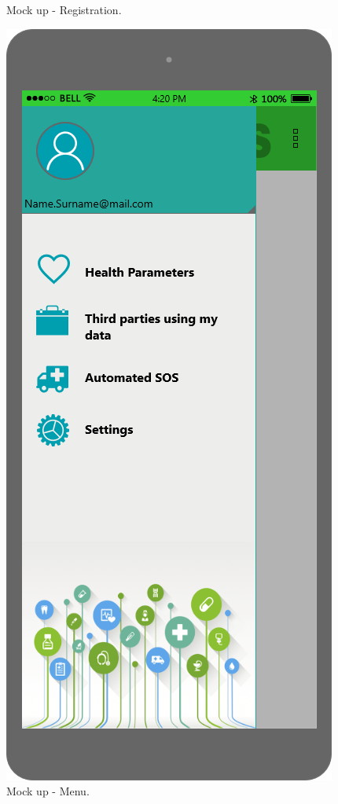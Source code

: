 \begin{figure}[h!]
\begin{minipage}[b]{0.25\textwidth}
    		\caption{Mock up - Registration.}
	\end{minipage}
	\hfill
	\begin{minipage}[b]{0.25\textwidth}
    		\includegraphics[width=\textwidth]{./pictures/menu.png}
    		\caption{Mock up - Menu.}
	\end{minipage}
\end{figure}

